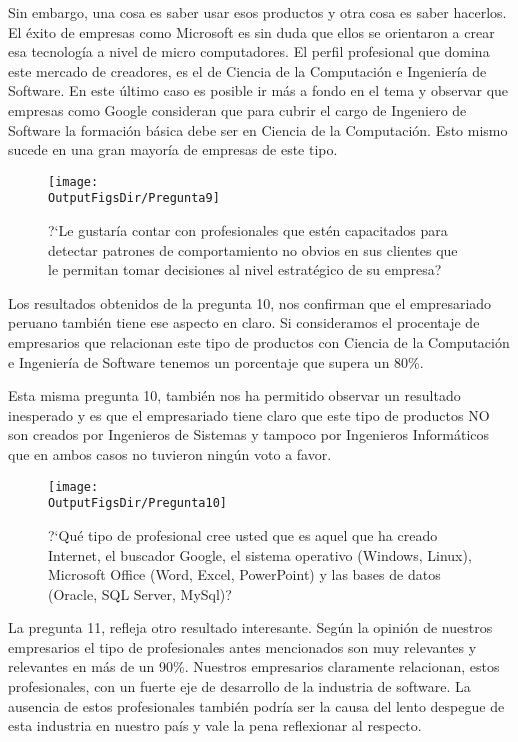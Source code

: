Sin embargo, una cosa es saber usar esos productos y otra cosa es saber hacerlos. El éxito de empresas como Microsoft es sin duda que ellos se orientaron a crear esa tecnología a nivel de micro computadores. El perfil profesional que domina este mercado de creadores, es el de Ciencia de la Computación e Ingeniería de Software. En este último caso es posible ir más a fondo en el tema y observar que empresas como Google consideran que para cubrir el cargo de Ingeniero de Software la formación básica debe ser en Ciencia de la Computación. Esto mismo sucede en una gran mayoría de empresas de este tipo.

\begin{figure}[!h]
	\centering
	\texttt{[image: \\OutputFigsDir/Pregunta9]}
	\label{fig:Preg9}
	\caption{?`Le gustaría contar con profesionales que estén capacitados para detectar patrones de comportamiento no obvios en sus clientes que le permitan tomar decisiones al nivel estratégico de su empresa?}
\end{figure}

Los resultados obtenidos de la pregunta 10, nos confirman que el empresariado peruano también tiene ese aspecto en claro. Si consideramos el procentaje de empresarios que relacionan este tipo de productos con Ciencia de la Computación e Ingeniería de Software tenemos un porcentaje que supera un 80\%.

Esta misma pregunta 10, también nos ha permitido observar un resultado inesperado y es que el empresariado tiene claro que este tipo de productos NO son creados por Ingenieros de Sistemas y tampoco por Ingenieros Informáticos que en ambos casos no tuvieron ningún voto a favor.

\begin{figure}[!h]
	\centering
	\texttt{[image: \\OutputFigsDir/Pregunta10]}
	\label{fig:Preg10}
	\caption{?`Qué tipo de profesional cree usted que es aquel que ha creado Internet, el buscador Google, el sistema operativo (Windows, Linux), Microsoft Office (Word, Excel, PowerPoint) y las bases de datos (Oracle, SQL Server, MySql)?}
\end{figure}

La pregunta 11, refleja otro resultado interesante. Según la opinión de nuestros empresarios el tipo de profesionales antes mencionados son muy relevantes y relevantes en más de un 90\%. Nuestros empresarios claramente relacionan, estos profesionales, con un fuerte eje de desarrollo de la industria de software. La ausencia de estos profesionales también podría ser la causa del lento despegue de esta industria en nuestro país y vale la pena reflexionar al respecto.


